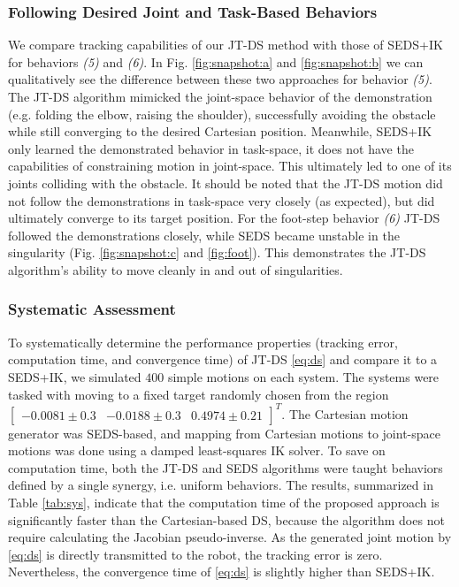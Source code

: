 \documentclass[letterpaper, 10 pt, conference,fleqn]{ieeeconf}
\begin{document}
\subsubsection{Following Desired Joint and Task-Based Behaviors}
We compare tracking capabilities of our JT-DS method with those of SEDS+IK for behaviors \textit{(5)} and \textit{(6)}. In Fig. \ref{fig:snapshot:a} and \ref{fig:snapshot:b} we can qualitatively see the difference between these two approaches for behavior \textit{(5)}. The JT-DS algorithm mimicked the joint-space behavior of the demonstration (e.g. folding the elbow, raising the shoulder), successfully avoiding the obstacle while still converging to the desired Cartesian position. Meanwhile, SEDS+IK only learned the demonstrated behavior in task-space, it does not have the capabilities of constraining motion in joint-space. This ultimately led to one of its joints colliding with the obstacle. It should be noted that the JT-DS motion did not follow the demonstrations in task-space very closely (as expected), but did ultimately converge to its target position. For the foot-step behavior \textit{(6)} JT-DS followed the demonstrations closely, while SEDS became unstable in the singularity (Fig. \ref{fig:snapshot:c} and \ref{fig:foot}). This demonstrates the JT-DS algorithm's ability to move cleanly in and out of singularities. %


\subsubsection{Systematic Assessment}
To systematically determine the performance properties (tracking error, computation time, and convergence time) of JT-DS \eqref{eq:ds} and compare it to a SEDS+IK, we simulated $400$ simple motions on each system. The systems were tasked with moving to a fixed target randomly chosen from the region $\begin{bmatrix} -0.0081\pm0.3&-0.0188\pm0.3&0.4974\pm0.21 \end{bmatrix}^T$. The Cartesian motion generator was SEDS-based, and mapping from Cartesian motions to joint-space motions was done using a damped least-squares IK solver. To save on computation time, both the JT-DS and SEDS algorithms were taught behaviors defined by a single synergy, i.e. uniform behaviors.  The results, summarized in Table \ref{tab:sys}, indicate that the computation time of the proposed approach is significantly faster than the Cartesian-based DS, because the algorithm does not require calculating the Jacobian pseudo-inverse. As the generated joint motion by \eqref{eq:ds} is directly transmitted to the robot, the tracking error is zero. Nevertheless, the convergence time of  \eqref{eq:ds} is slightly higher than SEDS+IK.
\end{document}
